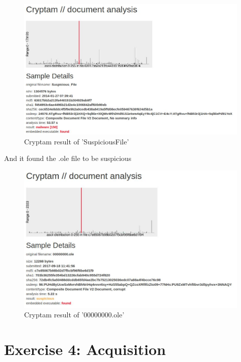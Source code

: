 \documentclass[a4paper,10pt,oneside]{article}
\begin{document}
\begin{figure}[ht]
        \centering
        \includegraphics[width=\textwidth]{cryptam_sus}
        \caption{Cryptam result of 'Suspicious\textunderscore File'}
\end{figure}

And it found the .ole file to be suspicious

\begin{figure}[ht]
  \centering
  \includegraphics[width=\textwidth]{images/cryptam_ole}
  \caption{Cryptam result of '00000000.ole'}
\end{figure}




\newpage
\section{Exercise 4: Acquisition}
\newpage
\end{document}
